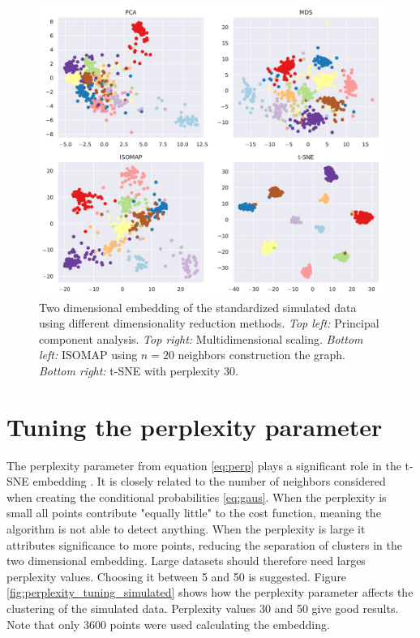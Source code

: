 \documentclass[a4paper, 10pt]{memoir}
\theoremstyle{plain}
\theoremstyle{definition}
\theoremstyle{remark}
\begin{document}
\begin{figure}[tb]
        \centering
        \includegraphics[width=1\linewidth]{./code/figures/dimensionality_reduction.pdf}
        \caption{Two dimensional embedding of the standardized simulated data using different dimensionality reduction methods.
        \textit{Top left:} Principal component analysis. 
\textit{Top right:} Multidimensional scaling.
\textit{Bottom left:} ISOMAP using $n = 20$ neighbors construction the graph.
\textit{Bottom right:} t-SNE with perplexity $30$.}
        \label{fig:dimensionality_reduction}
\end{figure}


\section{Tuning the perplexity parameter}
The perplexity parameter from equation \eqref{eq:perp} plays a significant role in the t-SNE embedding \cite{hinton}.
It is closely related to the number of neighbors considered when creating the conditional probabilities \eqref{eq:gaus}.
When the perplexity is small all points contribute "equally little" to the cost function, meaning the algorithm is not able to detect anything.
When the perplexity is large it attributes significance to more points, reducing the separation of clusters in the two dimensional embedding.
Large datasets should therefore need larges perplexity values.
Choosing it between 5 and 50 is suggested.
Figure \ref{fig:perplexity_tuning_simulated} shows how the perplexity parameter affects the clustering of the simulated data.
Perplexity values 30 and 50 give good results.
Note that only 3600 points were used calculating the embedding.
\end{document}
